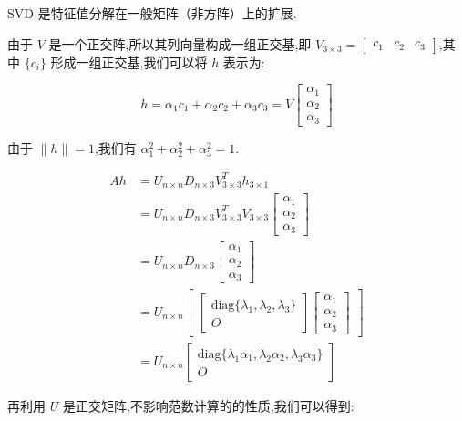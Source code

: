 SVD 是特征值分解在一般矩阵（非方阵）上的扩展.

由于 $V$ 是一个正交阵,所以其列向量构成一组正交基,即 $V_{3 \times 3} = \begin{bmatrix} c_1 & c_2 & c_3 \end{bmatrix}$,其中 $\{c_i\}$ 形成一组正交基,我们可以将 $h$ 表示为:

$$
h = \alpha_1 c_1 + \alpha_2 c_2 + \alpha_3 c_3 = V\begin{bmatrix} \alpha_1 \\ \alpha_2 \\ \alpha_3 \end{bmatrix}
$$

由于 $\|h\| = 1$,我们有 $\alpha_1^2 + \alpha_2^2 + \alpha_3^2 = 1$.

$$
\begin{aligned}
Ah &= U_{n \times n} D_{n \times 3} V^T_{3 \times 3} h_{3 \times 1} \\
&= U_{n \times n} D_{n \times 3} V^T_{3 \times 3} V_{3 \times 3} \begin{bmatrix} \alpha_1 \\ \alpha_2 \\ \alpha_3 \end{bmatrix} \\
&= U_{n \times n} D_{n \times 3} \begin{bmatrix} \alpha_1 \\ \alpha_2 \\ \alpha_3 \end{bmatrix} \\
&= U_{n \times n} \begin{bmatrix} \begin{bmatrix}
\text{diag}\{\lambda_1, \lambda_2, \lambda_3\} \\
O
\end{bmatrix} \begin{bmatrix} \alpha_1 \\ \alpha_2 \\ \alpha_3 \end{bmatrix} \end{bmatrix} \\
&= U_{n \times n} \begin{bmatrix} \text{diag}\{\lambda_1 \alpha_1, \lambda_2 \alpha_2, \lambda_3 \alpha_3\} \\ O \end{bmatrix}
\end{aligned}
$$

再利用 $U$ 是正交矩阵,不影响范数计算的的性质,我们可以得到:

